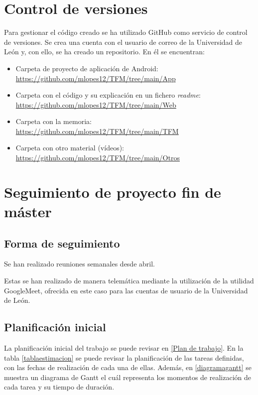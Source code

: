 \documentclass[12pt,a4paper,onecolumn,oneside]{report}
\begin{document}
\renewcommand{\appendixname}{Anexo}
\appendix

\chapter{Control de versiones}
\label{Control de versiones}

Para gestionar el código creado se ha utilizado GitHub como servicio de control de versiones. Se crea una cuenta con el usuario de correo de la Universidad de León y, con ello, se ha creado un repositorio. En él se encuentran:

\begin{itemize}
\item Carpeta de proyecto de aplicación de Android: \url{https://github.com/mlopes12/TFM/tree/main/App}
\item Carpeta con el código y su explicación en un fichero \textit{readme}: \url{https://github.com/mlopes12/TFM/tree/main/Web}
\item Carpeta con la memoria: \url{https://github.com/mlopes12/TFM/tree/main/TFM}
\item Carpeta con otro material (vídeos): \url{https://github.com/mlopes12/TFM/tree/main/Otros}
\end{itemize}

\chapter{Seguimiento de proyecto fin de máster}
\label{Seguimiento de proyecto fin de máster}

\section{Forma de seguimiento}

Se han realizado reuniones semanales desde abril. 

Estas se han realizado de manera telemática mediante la utilización de la utilidad GoogleMeet, ofrecida en este caso para las cuentas de usuario de la Universidad de León.

\section{Planificación inicial}

La planificación inicial del trabajo se puede revisar en \ref{Plan de trabajo}. En la tabla \ref{tablaestimacion} se puede revisar la planificación de las tareas definidas, con las fechas de realización de cada una de ellas. Además, en \ref{diagramagantt} se muestra un diagrama de Gantt el cuál representa los momentos de realización de cada tarea y su tiempo de duración.
\end{document}
